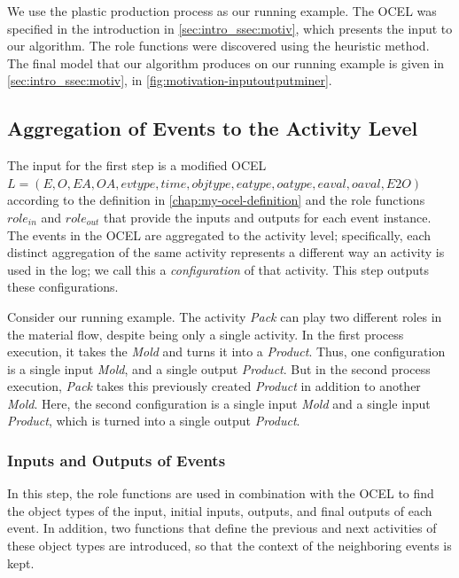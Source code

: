 We use the plastic production process as our running example.
The OCEL was specified in the introduction in \cref{sec:intro_ssec:motiv}, which presents the input to our algorithm.
The role functions were discovered using the heuristic method.
The final model that our algorithm produces on our running example is given in \cref{sec:intro_ssec:motiv}, in \autoref{fig:motivation-inputoutputminer}.



\subsection{Aggregation of Events to the Activity Level}



The input for the first step is a modified OCEL $L = (E, O, \allowbreak EA, \allowbreak OA, \allowbreak evtype, \allowbreak time, \allowbreak objtype, \allowbreak eatype, \allowbreak oatype, \allowbreak eaval, \allowbreak oaval, E2O)$ according to the definition in \cref{chap:my-ocel-definition} and the role functions $role_{in}$ and $role_{out}$ that provide the inputs and outputs for each event instance.
The events in the OCEL are aggregated to the activity level; specifically, each distinct aggregation of the same activity represents a different way an activity is used in the log; we call this a \emph{configuration} of that activity.
This step outputs these configurations.



Consider our running example.
The activity \emph{Pack} can play two different roles in the material flow, despite being only a single activity.
In the first process execution, it takes the \emph{Mold} and turns it into a \emph{Product}.
Thus, one configuration is a single input \emph{Mold}, and a single output \emph{Product}.
But in the second process execution, \emph{Pack} takes this previously created \emph{Product} in addition to another \emph{Mold}.
Here, the second configuration is a single input \emph{Mold} and a single input \emph{Product}, which is turned into a single output \emph{Product}.



\subsubsection{Inputs and Outputs of Events}



In this step, the role functions are used in combination with the OCEL to find the object types of the input, initial inputs, outputs, and final outputs of each event.
In addition, two functions that define the previous and next activities of these object types are introduced, so that the context of the neighboring events is kept.



